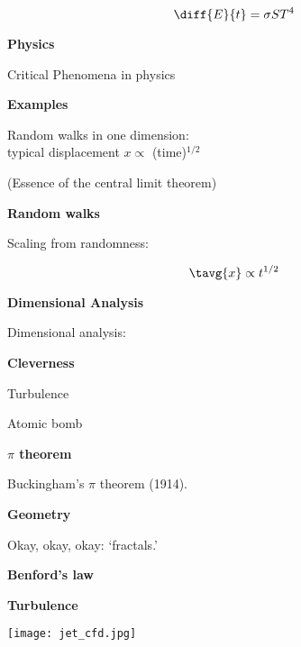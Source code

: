   $$\diff{E}{t} = \sigma S T^4$$



  \textbf{Physics}

  Critical Phenomena in physics



  \textbf{Examples}

  Random walks in one dimension:\\
  typical displacement $x \propto$ (time)$^{1/2}$


  (Essence of the central limit theorem)




  \textbf{Random walks}

  Scaling from randomness:



  $$\tavg{x} \propto t^{1/2}$$



  \textbf{Dimensional Analysis}

  Dimensional analysis:


  \textbf{Cleverness}

  Turbulence

  Atomic bomb


  \textbf{$\pi$ theorem}

  Buckingham's $\pi$ theorem (1914).





  \textbf{Geometry}

  Okay, okay, okay: `fractals.'



  \textbf{Benford's law}


  \textbf{Turbulence}


  \texttt{[image: jet\_cfd.jpg]}

